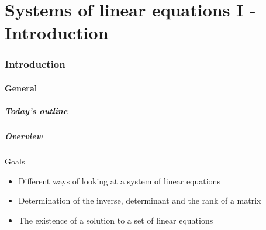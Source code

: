 \part{Systems of linear equations I - Introduction}
\section{Introduction}
\subsection*{General}
\begin{frame}[label=contentslin1]
  \frametitle{Today's outline}
\end{frame}

\begin{frame}
  \frametitle{Overview}
  \begin{block}{Goals}
    \begin{itemize}
      \item Different ways of looking at a system of linear equations
      \item Determination of the inverse, determinant and the rank of a matrix
      \item The existence of a solution to a set of linear equations
  \end{itemize}
  \end{block}
\end{frame}
% 
